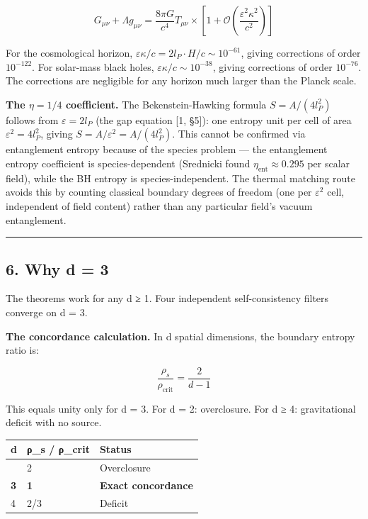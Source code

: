 \documentclass[
  11pt,
]{article}
\begin{document}
\[G_{\mu\nu} + \Lambda g_{\mu\nu} = \frac{8\pi G}{c^4} T_{\mu\nu} \times \left[1 + \mathcal{O}\!\left(\frac{\varepsilon^2 \kappa^2}{c^2}\right)\right]\]

For the cosmological horizon,
\(\varepsilon\kappa/c = 2l_P \cdot H/c \sim 10^{-61}\), giving
corrections of order \(10^{-122}\). For solar-mass black holes,
\(\varepsilon\kappa/c \sim 10^{-38}\), giving corrections of order
\(10^{-76}\). The corrections are negligible for any horizon much larger
than the Planck scale.

\textbf{The \(\eta = 1/4\) coefficient.} The Bekenstein-Hawking formula
\(S = A/(4l_P^2)\) follows from \(\varepsilon = 2l_P\) (the gap equation
{[}1, §5{]}): one entropy unit per cell of area
\(\varepsilon^2 = 4l_P^2\), giving \(S = A/\varepsilon^2 = A/(4l_P^2)\).
This cannot be confirmed via entanglement entropy because of the species
problem --- the entanglement entropy coefficient is species-dependent
(Srednicki found \(\eta_{\text{ent}} \approx 0.295\) per scalar field),
while the BH entropy is species-independent. The thermal matching route
avoids this by counting classical boundary degrees of freedom (one per
\(\varepsilon^2\) cell, independent of field content) rather than any
particular field's vacuum entanglement.

\begin{center}\rule{0.5\linewidth}{0.5pt}\end{center}

\hypertarget{why-d-3}{%
\subsection{6. Why d = 3}\label{why-d-3}}

The theorems work for any d ≥ 1. Four independent self-consistency
filters converge on d = 3.

\textbf{The concordance calculation.} In d spatial dimensions, the
boundary entropy ratio is:

\[\frac{\rho_s}{\rho_{\text{crit}}} = \frac{2}{d-1}\]

This equals unity only for d = 3. For d = 2: overclosure. For d ≥ 4:
gravitational deficit with no source.

\begin{longtable}[]{@{}lll@{}}
\toprule\noalign{}
d & ρ\_s / ρ\_crit & Status \\
\midrule\noalign{}
\endhead
\bottomrule\noalign{}
\endlastfoot
2 & 2 & Overclosure \\
\textbf{3} & \textbf{1} & \textbf{Exact concordance} \\
4 & 2/3 & Deficit \\
\end{longtable}
\end{document}
